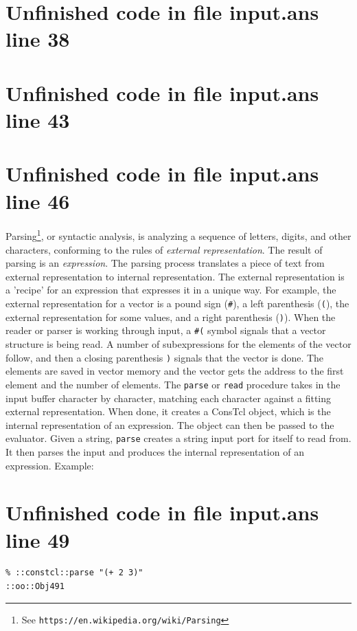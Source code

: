 \documentclass[twoside,9pt]{report}
\begin{document}
\section{Unfinished code in file input.ans line 38}
\section{Unfinished code in file input.ans line 43}
\section{Unfinished code in file input.ans line 46}

Parsing\footnote{See \texttt{https://en.wikipedia.org/wiki/Parsing}}, or syntactic analysis, is analyzing a sequence of letters, digits, and other characters, conforming to the rules of \emph{external representation}. The result of parsing is an \emph{expression}. The parsing process translates a piece of text from external representation to internal representation. The external representation is a 'recipe' for an expression that expresses it in a unique way. For example, the external representation for a vector is a pound sign (\texttt{\#}), a left parenthesis (\texttt{(}), the external representation for some values, and a right parenthesis (\texttt{)}). When the reader or parser is working through input, a \texttt{\#(} symbol signals that a vector structure is being read. A number of subexpressions for the elements of the vector follow, and then a closing parenthesis \texttt{)} signals that the vector is done. The elements are saved in vector memory and the vector gets the address to the first element and the number of elements. The \texttt{parse} or \texttt{read} procedure takes in the input buffer character by character, matching each character against a fitting external representation. When done, it creates a ConsTcl object, which is the internal representation of an expression. The object can then be passed to the evaluator. Given a string, \texttt{parse} creates a string input port for itself to read from. It then parses the input and produces the internal representation of an expression. Example:

\section{Unfinished code in file input.ans line 49}
\begin{verbatim}
% ::constcl::parse "(+ 2 3)"
::oo::Obj491
\end{verbatim}
\end{document}
